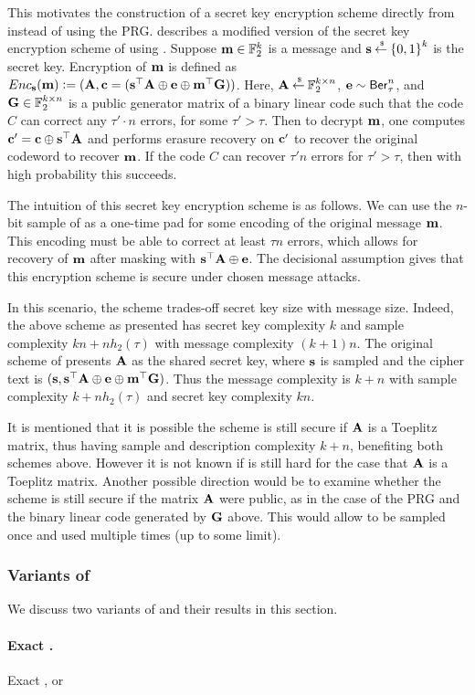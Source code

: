 This motivates the construction of a secret key encryption scheme directly from \LPN instead of using the \LPN PRG.
\cite{Piet12} describes a modified version of the secret key encryption scheme of \cite{ICALP:GilRobSeu08} using \LPN.
Suppose ${\mathbf m} \in {\mathbb F}_2^k$ is a message and ${\mathbf s} \mathbin{\stackrel{\mbox{\,\tiny \$}}{\gets}} {\{0,1\}}^k$ is the secret key.
Encryption of ${\mathbf m}$ is defined as $Enc_{\mathbf s}({\mathbf m}) {\;\vcentcolon=\;} ({\mathbf A}, {\mathbf c} = ({\mathbf s}^\top{\mathbf A} \oplus {\mathbf e} \oplus {\mathbf m}^\top{\mathbf G}))$.
Here, ${\mathbf A} \mathbin{\stackrel{\mbox{\,\tiny \$}}{\gets}} {\mathbb F}_2^{k\times n}$, ${\mathbf e} \sim \mathsf{Ber}_\tau^n$, and ${\mathbf G} \in {\mathbb F}_2^{k\times n}$ is a public generator matrix of a binary linear code such that the code $C$ can correct any $\tau'\cdot n$ errors, for some $\tau' > \tau$.
Then to decrypt ${\mathbf m}$, one computes ${\mathbf c}' = {\mathbf c} \oplus {\mathbf s}^\top {\mathbf A}$ and performs erasure recovery on ${\mathbf c}'$ to recover the original codeword to recover ${\mathbf m}$.
If the code $C$ can recover $\tau' n$ errors for $\tau' > \tau$, then with high probability this succeeds.

The intuition of this secret key encryption scheme is as follows.
We can use the $n$-bit sample of \LPN as a one-time pad for some encoding of the original message ${\mathbf m}$.
This encoding must be able to correct at least $\tau n $ errors, which allows for recovery of ${\mathbf m}$ after masking with ${\mathbf s}^\top {\mathbf A} \oplus {\mathbf e}$.
The decisional \LPN assumption gives that this encryption scheme is secure under chosen message attacks.

In this scenario, the scheme trades-off secret key size with message size.
Indeed, the above scheme as presented has secret key complexity $k$ and sample complexity $kn + nh_2(\tau)$ with message complexity $(k+1)n$.
The original scheme of \cite{ICALP:GilRobSeu08} presents ${\mathbf A}$ as the shared secret key, where ${\mathbf s}$ is sampled and the cipher text is $({\mathbf s}, {\mathbf s}^\top {\mathbf A} \oplus {\mathbf e} \oplus {\mathbf m}^\top{\mathbf G})$.
Thus the message complexity is $k + n$ with sample complexity $k + nh_2(\tau)$ and secret key complexity $kn$.

It is mentioned that it is possible the scheme is still secure if ${\mathbf A}$ is a Toeplitz matrix, thus having sample and description complexity $k+n$, benefiting both schemes above.
However it is not known if \LPN is still hard for the case that ${\mathbf A}$ is a Toeplitz matrix.
Another possible direction would be to examine whether the scheme is still secure if the matrix ${\mathbf A}$ were public, as in the case of the \LPN PRG and the binary linear code generated by ${\mathbf G}$ above.
This would allow \bA to be sampled once and used multiple times (up to some limit).




\subsubsection{Variants of \LPN}
We discuss two variants of \LPN and their results in this section.

\paragraph{Exact \LPN.} Exact \LPN, or \XLPN

